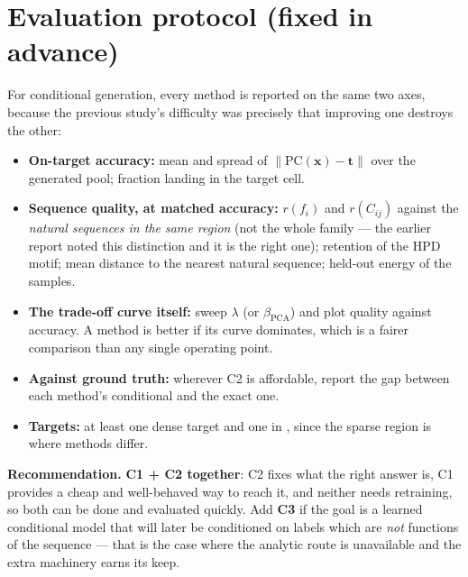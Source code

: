\documentclass[10pt,a4paper]{article}
\newcommand{\PC}{\mathrm{PC}}
\newcommand{\PCA}{\mathrm{PCA}}
\begin{document}
\section{Evaluation protocol (fixed in advance)}
For conditional generation, every method is reported on the same two axes, because the previous
study's difficulty was precisely that improving one destroys the other:
\begin{itemize}[leftmargin=*,itemsep=1pt]
\item \textbf{On-target accuracy:} mean and spread of $\|\PC(\bm x)-\bm t\|$ over the generated
      pool; fraction landing in the target cell.
\item \textbf{Sequence quality, at matched accuracy:} $r(f_i)$ and $r(C_{ij})$ against the
      \emph{natural sequences in the same region} (not the whole family --- the earlier report
      noted this distinction and it is the right one); retention of the HPD motif; mean distance
      to the nearest natural sequence; held-out energy of the samples.
\item \textbf{The trade-off curve itself:} sweep $\lambda$ (or $\beta_{\PCA}$) and plot quality
      against accuracy. A method is better if its curve dominates, which is a fairer comparison
      than any single operating point.
\item \textbf{Against ground truth:} wherever C2 is affordable, report the gap between each
      method's conditional and the exact one.
\item \textbf{Targets:} at least one dense target and one in \MissCl, since the sparse region is
      where methods differ.
\end{itemize}

\vspace{0.2cm}
\noindent\textbf{Recommendation.} \textbf{C1 + C2 together}: C2 fixes what the right answer is,
C1 provides a cheap and well-behaved way to reach it, and neither needs retraining, so both can be
done and evaluated quickly. Add \textbf{C3} if the goal is a learned conditional model that will
later be conditioned on labels which are \emph{not} functions of the sequence --- that is the case
where the analytic route is unavailable and the extra machinery earns its keep.
\end{document}
